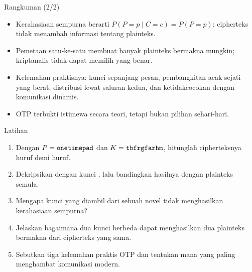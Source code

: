 \documentclass[aspectratio=169,11pt]{beamer}
\begin{document}
\begin{frame}{Rangkuman (2/2)}
    \footnotesize
    \begin{itemize}
        \item Kerahasiaan sempurna berarti
              $P(P=p \mid C=c)=P(P=p)$: cipherteks tidak menambah
              informasi tentang plainteks.
        \item Pemetaan satu-ke-satu membuat banyak plainteks bermakna
              mungkin; kriptanalis tidak dapat memilih yang benar.
        \item Kelemahan praktisnya: kunci sepanjang pesan, pembangkitan
              acak sejati yang berat, distribusi lewat saluran kedua, dan
              ketidakcocokan dengan komunikasi dinamis.
        \item OTP terbukti istimewa secara teori, tetapi bukan pilihan
              sehari-hari.
    \end{itemize}
\end{frame}

\begin{frame}{Latihan}
    \footnotesize
    \begin{enumerate}
        \item Dengan $P=\texttt{onetimepad}$ dan $K=\texttt{tbfrgfarhm}$,
              hitunglah cipherteksnya huruf demi huruf.
        \item Dekripsikan  dengan kunci
              , lalu bandingkan hasilnya dengan plainteks
              semula.
        \item Mengapa kunci yang diambil dari sebuah novel tidak
              menghasilkan kerahasiaan sempurna?
        \item Jelaskan bagaimana dua kunci berbeda dapat menghasilkan dua
              plainteks bermakna dari cipherteks yang sama.
        \item Sebutkan tiga kelemahan praktis OTP dan tentukan mana yang
              paling menghambat komunikasi modern.
    \end{enumerate}
\end{frame}
\end{document}
